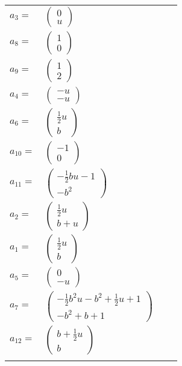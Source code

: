 \documentclass[1p]{elsarticle_modified}
\theoremstyle{definition}
\begin{document}
\begin{tabular}{m{7pt} m{180pt} m{7pt} m{180pt} }
\flushright $a_{3}=$&$\begin{pmatrix}0\\u\end{pmatrix}$ \\
\flushright $a_{8}=$&$\begin{pmatrix}1\\0\end{pmatrix}$ \\
\flushright $a_{9}=$&$\begin{pmatrix}1\\2\end{pmatrix}$ \\
\flushright $a_{4}=$&$\begin{pmatrix}- u\\- u\end{pmatrix}$ \\
\flushright $a_{6}=$&$\begin{pmatrix}\frac{1}{2} u\\b\end{pmatrix}$ \\
\flushright $a_{10}=$&$\begin{pmatrix}-1\\0\end{pmatrix}$ \\
\flushright $a_{11}=$&$\begin{pmatrix}-\frac{1}{2} b u-1\\- b^2\end{pmatrix}$ \\
\flushright $a_{2}=$&$\begin{pmatrix}\frac{1}{2} u\\b+u\end{pmatrix}$ \\
\flushright $a_{1}=$&$\begin{pmatrix}\frac{1}{2} u\\b\end{pmatrix}$ \\
\flushright $a_{5}=$&$\begin{pmatrix}0\\- u\end{pmatrix}$ \\
\flushright $a_{7}=$&$\begin{pmatrix}-\frac{1}{2} b^2 u- b^2+\frac{1}{2} u+1\\- b^2+b+1\end{pmatrix}$ \\
\flushright $a_{12}=$&$\begin{pmatrix}b+\frac{1}{2} u\\b\end{pmatrix}$\\&\end{tabular}
\end{document}
